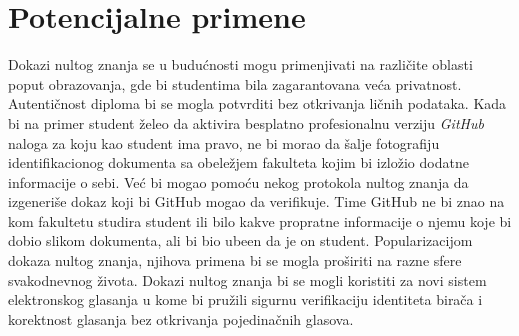 \section{Potencijalne primene}
Dokazi nultog znanja se u budu\' cnosti mogu primenjivati na razli\v cite oblasti poput obrazovanja, gde bi studentima bila zagarantovana ve\' ca privatnost. Autenti\v cnost diploma bi se mogla potvrditi bez otkrivanja li\v cnih podataka. Kada bi na primer student \v zeleo da aktivira besplatno profesionalnu verziju {\it \textenglish{GitHub}} naloga za koju kao student ima pravo,  ne bi morao da \v salje fotografiju identifikacionog dokumenta sa obele\v zjem fakulteta kojim bi izlo\v zio dodatne informacije o sebi. Ve\' c bi  mogao pomo\' cu nekog protokola nultog znanja da izgeneri\v se dokaz koji bi \textenglish{GitHub} mogao da verifikuje. Time \textenglish{GitHub} ne bi znao na kom fakultetu studira student ili bilo kakve propratne informacije o njemu koje bi dobio slikom dokumenta, ali bi bio ube\dj en da je on student. Popularizacijom dokaza nultog znanja, njihova primena bi se mogla proširiti na razne sfere svakodnevnog života. Dokazi nultog znanja bi se mogli koristiti za novi sistem elektronskog glasanja u kome bi pru\v zili sigurnu verifikaciju identiteta bira\v ca i korektnost glasanja bez otkrivanja pojedina\v cnih glasova.